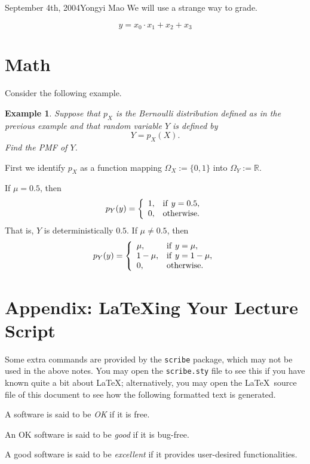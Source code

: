 \documentclass{article}
\newtheorem{ex}{Example}
\begin{document}
\begin{lecture}{September 4th, 2004}{Yongyi Mao}
We will use a strange way to grade. 

\[
y=x_0\cdot x_1 + x_2 + x_3
\]


\section{Math}
Consider the following example.
\begin{ex}
Suppose that $p_X$ is the Bernoulli distribution defined as in the
previous example and that random variable $Y$ is defined by
\[
Y=p_X(X).
\]
Find the PMF of $Y$.
\end{ex}


First we identify $p_X$ as a function mapping $\Omega_X:=\{0, 1\}$
into $\Omega_Y:={\mathbb R}$.  

If $\mu=0.5$, then
\[
p_Y(y)=\left\{
\begin{array}{ll}
1,& {\rm if}~y=0.5,\\
0, & {\rm otherwise}.
\end{array}
\right.
\]
That is, $Y$ is deterministically $0.5$.
If $\mu \neq 0.5$, then
\[
p_Y(y)=\left\{
\begin{array}{ll}
\mu,& {\rm if}~y=\mu,\\
1-\mu, & {\rm if}~y=1-\mu,\\
0, &{\rm otherwise}.
\end{array}
\right.
\]



\section*{Appendix: \LaTeX ing Your Lecture Script}

 Some extra commands are provided by the 
{\tt scribe} package, which may  not be used in the above notes.  
You may open the {\tt scribe.sty} file 
to see this if you have known quite a bit about \LaTeX; alternatively, 
you may open the \LaTeX\ source file of 
this document to see how the following formatted text is generated. 


\begin{definition}
A software is said to be {\em OK} if it is free. 
\end{definition}

\begin{definition}
An OK  software is said to be {\em good} if it is bug-free.
\end{definition}

\begin{definition}
A good software is said to be {\em excellent} if it provides
user-desired functionalities.
\end{definition}




\end{lecture}
\end{document}
